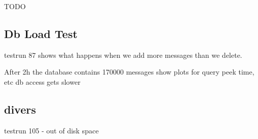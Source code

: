 \documentclass[milestone1.tex]{subfiles}
\begin{document}
TODO




\subsection{Db Load Test}

testrun 87 shows what happens when we add more messages than we delete. 

After 2h the database contains 170000 messages
show plots for query peek time, etc
db access gets slower

\subsection{divers}

testrun 105 - out of disk space
\end{document}

